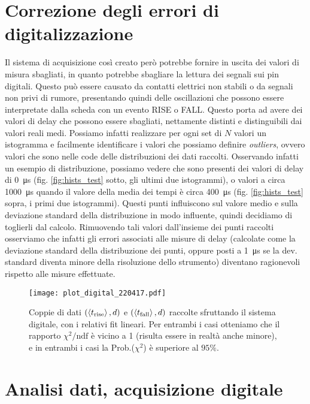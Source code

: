 \documentclass[
    prl,
    reprint, 
    superscriptaddress, 
    altaffilletter, 
    amsmath, 
    amssymb, 
    a4paper,
    varvw]{revtex4-2}
\begin{document}
\section{Correzione degli errori di digitalizzazione}\label{sec:error_stat}
Il sistema di acquisizione così creato però potrebbe fornire in uscita dei valori di misura sbagliati, in quanto potrebbe sbagliare la lettura dei segnali sui pin digitali. Questo può essere causato da contatti elettrici non stabili o da segnali non privi di rumore, presentando quindi delle oscillazioni che possono essere interpretate dalla scheda con un evento RISE o FALL. Questo porta ad avere dei valori di delay che possono essere sbagliati, nettamente distinti e distinguibili dai valori reali medi. Possiamo infatti realizzare per ogni set di $N$ valori un istogramma e facilmente identificare i valori che possiamo definire \emph{outliers}, ovvero valori che sono nelle code delle distribuzioni dei dati raccolti. Osservando infatti un esempio di distribuzione, possiamo vedere che sono presenti dei valori di delay di \SI{0}{\micro\second} (fig. \ref{fig:hists_test} sotto, gli ultimi due istogrammi), o valori a circa \SI{1000}{\micro\second} quando il valore della media dei tempi è circa \SI{400}{\micro\second} (fig. \ref{fig:hists_test} sopra, i primi due istogrammi).
Questi punti influiscono sul valore medio e sulla deviazione standard della distribuzione in modo influente, quindi decidiamo di toglierli dal calcolo. Rimuovendo tali valori dall'insieme dei punti raccolti osserviamo che infatti gli errori associati alle misure di delay (calcolate come la deviazione standard della distribuzione dei punti, oppure posti a \SI{1}{\micro\second} se la dev. standard diventa minore della risoluzione dello strumento) diventano ragionevoli rispetto alle misure effettuate. 

\begin{figure}[!t]
    \centering
    \texttt{[image: plot\_digital\_220417.pdf]}
    \caption{Coppie di dati $(\expval{t_\text{rise}}, d)$ e $(\expval{t_\text{fall}}, d)$ raccolte sfruttando il sistema digitale, con i relativi fit lineari. Per entrambi i casi otteniamo che il rapporto $\chi^2/\text{ndf}$ è vicino a 1 (risulta essere in realtà anche minore), e in entrambi i casi la Prob.($\chi^2$) è superiore al $95\%$.}\label{fig:digital_plot_d2}
\end{figure}

\section{Analisi dati, acquisizione digitale}
\end{document}
